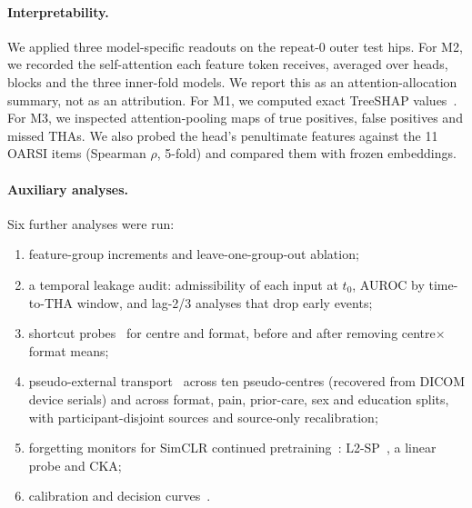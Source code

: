 

\paragraph{Interpretability.}
We applied three model-specific readouts on the repeat-0 outer test hips. For M2, we recorded the self-attention each
feature token receives, averaged over heads, blocks and the three inner-fold models. We report this as an
attention-allocation summary, not as an attribution. For M1, we computed exact TreeSHAP values~\cite{lundberg2017shap}.
For M3, we inspected attention-pooling maps of true positives, false positives and missed THAs. We also probed the head's
penultimate features against the 11 OARSI items (Spearman $\rho$, 5-fold) and compared them with frozen embeddings.

\paragraph{Auxiliary analyses.}
Six further analyses were run:
\begin{enumerate}[leftmargin=*,itemsep=0pt,topsep=2pt]
  \item feature-group increments and leave-one-group-out ablation;
  \item a temporal leakage audit: admissibility of each input at $t_0$, AUROC by time-to-THA window, and lag-2/3
        analyses that drop early events;
  \item shortcut probes~\cite{geirhos2020shortcut} for centre and format, before and after removing centre$\times$format
        means;
  \item pseudo-external transport~\cite{steyerberg2016validation} across ten pseudo-centres (recovered from DICOM device
        serials) and across format, pain, prior-care, sex and education splits, with participant-disjoint sources and
        source-only recalibration;
  \item forgetting monitors for SimCLR continued pretraining~\cite{chen2020simclr}: L2-SP~\cite{li2018l2sp}, a linear
        probe and CKA;
  \item calibration and decision curves~\cite{vickers2006dca}.
\end{enumerate}
